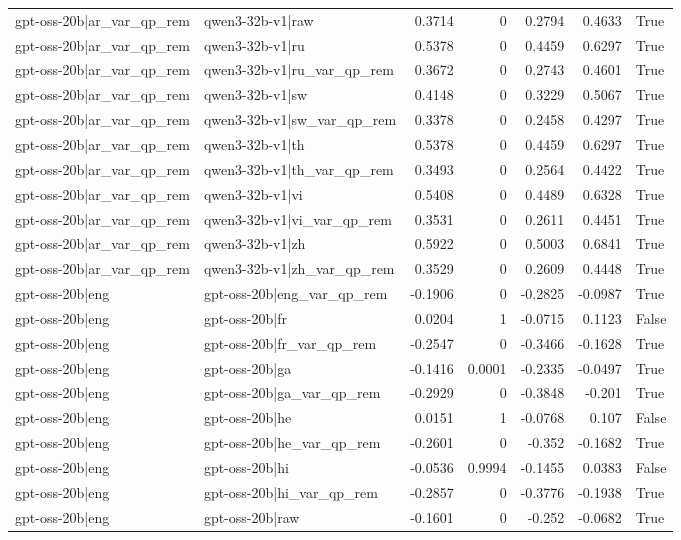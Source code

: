 \begin{table}
\begin{tabular}{l l r r r r l}
gpt-oss-20b|ar_var_qp_rem & qwen3-32b-v1|raw & 0.3714 & 0 & 0.2794 & 0.4633 & True \\
gpt-oss-20b|ar_var_qp_rem & qwen3-32b-v1|ru & 0.5378 & 0 & 0.4459 & 0.6297 & True \\
gpt-oss-20b|ar_var_qp_rem & qwen3-32b-v1|ru_var_qp_rem & 0.3672 & 0 & 0.2743 & 0.4601 & True \\
gpt-oss-20b|ar_var_qp_rem & qwen3-32b-v1|sw & 0.4148 & 0 & 0.3229 & 0.5067 & True \\
gpt-oss-20b|ar_var_qp_rem & qwen3-32b-v1|sw_var_qp_rem & 0.3378 & 0 & 0.2458 & 0.4297 & True \\
gpt-oss-20b|ar_var_qp_rem & qwen3-32b-v1|th & 0.5378 & 0 & 0.4459 & 0.6297 & True \\
gpt-oss-20b|ar_var_qp_rem & qwen3-32b-v1|th_var_qp_rem & 0.3493 & 0 & 0.2564 & 0.4422 & True \\
gpt-oss-20b|ar_var_qp_rem & qwen3-32b-v1|vi & 0.5408 & 0 & 0.4489 & 0.6328 & True \\
gpt-oss-20b|ar_var_qp_rem & qwen3-32b-v1|vi_var_qp_rem & 0.3531 & 0 & 0.2611 & 0.4451 & True \\
gpt-oss-20b|ar_var_qp_rem & qwen3-32b-v1|zh & 0.5922 & 0 & 0.5003 & 0.6841 & True \\
gpt-oss-20b|ar_var_qp_rem & qwen3-32b-v1|zh_var_qp_rem & 0.3529 & 0 & 0.2609 & 0.4448 & True \\
gpt-oss-20b|eng & gpt-oss-20b|eng_var_qp_rem & -0.1906 & 0 & -0.2825 & -0.0987 & True \\
gpt-oss-20b|eng & gpt-oss-20b|fr & 0.0204 & 1 & -0.0715 & 0.1123 & False \\
gpt-oss-20b|eng & gpt-oss-20b|fr_var_qp_rem & -0.2547 & 0 & -0.3466 & -0.1628 & True \\
gpt-oss-20b|eng & gpt-oss-20b|ga & -0.1416 & 0.0001 & -0.2335 & -0.0497 & True \\
gpt-oss-20b|eng & gpt-oss-20b|ga_var_qp_rem & -0.2929 & 0 & -0.3848 & -0.201 & True \\
gpt-oss-20b|eng & gpt-oss-20b|he & 0.0151 & 1 & -0.0768 & 0.107 & False \\
gpt-oss-20b|eng & gpt-oss-20b|he_var_qp_rem & -0.2601 & 0 & -0.352 & -0.1682 & True \\
gpt-oss-20b|eng & gpt-oss-20b|hi & -0.0536 & 0.9994 & -0.1455 & 0.0383 & False \\
gpt-oss-20b|eng & gpt-oss-20b|hi_var_qp_rem & -0.2857 & 0 & -0.3776 & -0.1938 & True \\
gpt-oss-20b|eng & gpt-oss-20b|raw & -0.1601 & 0 & -0.252 & -0.0682 & True \\

\end{tabular}
\end{table}
